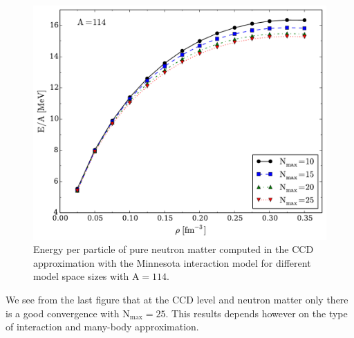   \begin{figure}
    \includegraphics[width=\linewidth]{Chapter8-figures/fig2.pdf}
    \caption{Energy per particle of pure neutron matter computed in
      the CCD approximation with the Minnesota interaction model  \cite{minnesota} for different
      model space sizes with $\mathrm{A=114}$.}
    \label{fig:fig2}
  \end{figure}
We see from the last figure that at the CCD level and neutron matter only there is a good convergence with  $\mathrm{N_{max}=25}$.
This results depends however on the type of interaction and many-body approximation. 

